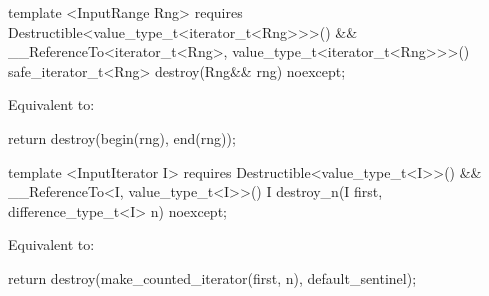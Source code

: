 {\color{addclr}
\begin{codeblock}
template <InputRange Rng>
  requires Destructible<value_type_t<iterator_t<Rng>>>() &&
           __ReferenceTo<iterator_t<Rng>, value_type_t<iterator_t<Rng>>>()
    safe_iterator_t<Rng> destroy(Rng&& rng) noexcept;
\end{codeblock}

\pnum
\effects Equivalent to:
\begin{codeblock}
        return destroy(begin(rng), end(rng));
\end{codeblock}

\begin{codeblock}
template <InputIterator I>
  requires Destructible<value_type_t<I>>() &&
           __ReferenceTo<I, value_type_t<I>>()
    I destroy_n(I first, difference_type_t<I> n) noexcept;
\end{codeblock}

\pnum
\effects Equivalent to:
\begin{codeblock}
        return destroy(make_counted_iterator(first, n), default_sentinel{});
\end{codeblock}
} %